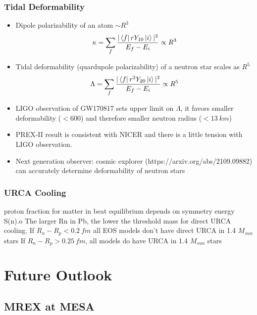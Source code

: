 \subsubsection{Tidal Deformability}
\begin{itemize}
    \item Dipole polarizability of an atom $\sim R^3$
	$$ \kappa = \sum_f \frac{|\bra{f}rY_{10}\ket{i}|^2}{E_f - E_i} \propto R^3 $$
    \item Tidal deformability (quardupole polarizability) of a neutron star scales as $R^5$
	$$ \Lambda = \sum_f \frac{|\bra{f}r^2Y_{20}\ket{i}|^2}{E_f - E_i} \propto R^5 $$
    \item LIGO observation of GW170817 sets upper limit on $\Lambda$, it favors
	smaller deformability ($<600$) and therefore smaller neutron radius ($<13\ km$)
    \item PREX-II result is consistent with NICER and there is a little tension 
	with LIGO observation.
    \item Next generation observer: cosmic explorer (https://arxiv.org/abs/2109.09882)
	can accurately determine deformability of neutron stars
\end{itemize}

\subsubsection{URCA Cooling}
proton fraction for matter in beat equilibrium depends on symmetry energy S(n).o
The larger Rn in Pb, the lower the threshold mass for direct URCA cooling.
If $R_n - R_p < 0.2 \ fm$ all EOS models don't have direct URCA in 1.4 $M_{sun}$ stars
If $R_n - R_p > 0.25 \ fm$, all models do have URCA in 1.4 $M_{sun}$ stars

\section{Future Outlook}
\subsection{MREX at MESA}

